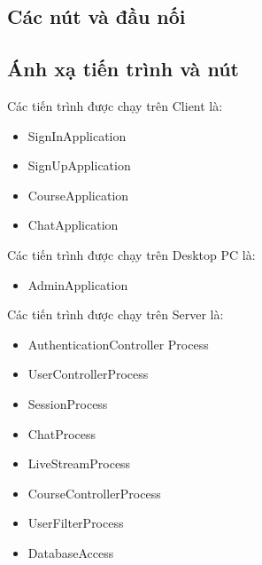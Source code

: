 \documentclass[./../main_file.tex]{subfiles}
\begin{document}
	\subsection{Các nút và đầu nối}
	\subsection{Ánh xạ tiến trình và nút}
	
	Các tiến trình được chạy trên Client là:
	\begin{itemize}[leftmargin=+0.5in]
		\item SignInApplication
		\item SignUpApplication
		\item CourseApplication
		\item ChatApplication
	\end{itemize}


	Các tiến trình được chạy trên Desktop PC là:
	\begin{itemize}[leftmargin=+0.5in]
		\item AdminApplication
	\end{itemize}


	Các tiến trình được chạy trên Server là:
	\begin{itemize}[leftmargin=+0.5in]
		\item AuthenticationController Process
		\item UserControllerProcess
		\item SessionProcess
		\item ChatProcess
		\item LiveStreamProcess
		\item CourseControllerProcess
		\item UserFilterProcess
		\item DatabaseAccess
	\end{itemize}
\end{document}
